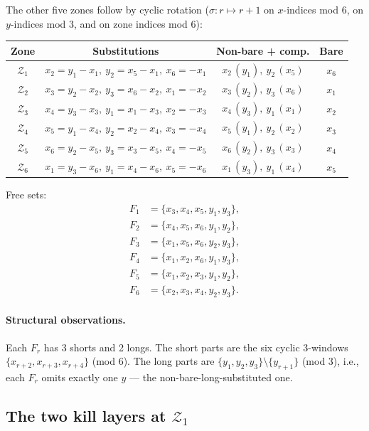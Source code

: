 \documentclass[11pt]{article}
\newcommand{\Z}{\mathcal{Z}}
\theoremstyle{definition}
\begin{document}
The other five zones follow by cyclic rotation ($\sigma:r\mapsto r+1$ on
$x$-indices mod 6, on $y$-indices mod 3, and on zone indices mod 6):

\begin{center}
\renewcommand{\arraystretch}{1.2}
\begin{tabular}{c|c|c|c}
\toprule
Zone & Substitutions & Non-bare + comp. & Bare \\
\midrule
$\Z_1$ & $x_2=y_1-x_1,\ y_2=x_5-x_1,\ x_6=-x_1$ & $x_2\,(y_1),\ y_2\,(x_5)$ & $x_6$ \\
$\Z_2$ & $x_3=y_2-x_2,\ y_3=x_6-x_2,\ x_1=-x_2$ & $x_3\,(y_2),\ y_3\,(x_6)$ & $x_1$ \\
$\Z_3$ & $x_4=y_3-x_3,\ y_1=x_1-x_3,\ x_2=-x_3$ & $x_4\,(y_3),\ y_1\,(x_1)$ & $x_2$ \\
$\Z_4$ & $x_5=y_1-x_4,\ y_2=x_2-x_4,\ x_3=-x_4$ & $x_5\,(y_1),\ y_2\,(x_2)$ & $x_3$ \\
$\Z_5$ & $x_6=y_2-x_5,\ y_3=x_3-x_5,\ x_4=-x_5$ & $x_6\,(y_2),\ y_3\,(x_3)$ & $x_4$ \\
$\Z_6$ & $x_1=y_3-x_6,\ y_1=x_4-x_6,\ x_5=-x_6$ & $x_1\,(y_3),\ y_1\,(x_4)$ & $x_5$ \\
\bottomrule
\end{tabular}
\end{center}

Free sets:
\begin{equation}
\label{eq:Fsets}
\begin{aligned}
F_1 &= \{x_3, x_4, x_5, y_1, y_3\},\\
F_2 &= \{x_4, x_5, x_6, y_1, y_2\},\\
F_3 &= \{x_1, x_5, x_6, y_2, y_3\},\\
F_4 &= \{x_1, x_2, x_6, y_1, y_3\},\\
F_5 &= \{x_1, x_2, x_3, y_1, y_2\},\\
F_6 &= \{x_2, x_3, x_4, y_2, y_3\}.
\end{aligned}
\end{equation}

\paragraph{Structural observations.} Each $F_r$ has 3 shorts and 2 longs.
The short parts are the six cyclic 3-windows $\{x_{r+2}, x_{r+3}, x_{r+4}\}$
(mod 6). The long parts are $\{y_1, y_2, y_3\}\setminus\{y_{r+1}\}$ (mod 3),
i.e., each $F_r$ omits exactly one $y$ — the non-bare-long-substituted one.

\subsection{The two kill layers at \texorpdfstring{$\Z_1$}{Z1}}
\end{document}
